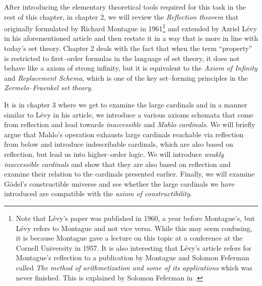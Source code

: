After introducing the elementary theoretical tools required for this task in the rest of this chapter, in chapter 2, we will review the \emph{Reflection theorem} that originally formulated by Richard Montague in 1961\footnote{Note that Lévy's paper was published in 1960, a year before Montague's, but Lévy refers to Montague and not vice versa. While this may seem confusing, it is because Montague gave a lecture on this topic at a conference at the Cornell University in 1957. It is also interesting that Lévy's article refers for Montague's reflection to a publication by Montague and Solomon Feferman called \emph{The method of arithmetization and some of its applications} which was never finished. This is explained by Solomon Feferman in \cite{Feferman2008}.} and extended by Azriel Lévy in his aforementioned article and then restate it in a way that is more in line with today's set theory. 
Chapter 2 deals with the fact that when the term ``property'' is restricted to first–order formulas in the language of set theory, it does not behave like a axiom of strong infinity, but it is equivalent to the \emph{Axiom of Infinity} and \emph{Replacement Schema}, which is one of the key set–forming principles in the \emph{Zermelo–Fraenkel set theory}.

It is in chapter 3 where we get to examine the large cardinals and in a manner similar to Lévy in his article, we introduce a various axioms schemata that come from reflection and lead towards \emph{inaccessible} and \emph{Mahlo cardinals}. We will briefly argue that Mahlo's operation exhausts large cardinals reachable via reflection from below and introduce indescribable cardinals, which are also based on reflection, but lead us into higher–order logic. We will introduce \emph{weakly inaccessible cardinals} and show that they are also based on reflection and examine their relation to the cardinals presented earlier. Finally, we will examine Gödel's constructible universe and see whether the large cardinals we have introduced are compatible with the \emph{axiom of constructibility}.


